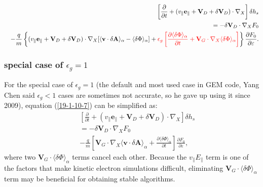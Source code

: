 \documentclass{llncs}
\newcommand{\tmcolor}[2]{{\color{#1}{#2}}}
\begin{document}
\begin{eqnarray}
  &  & \left[ \frac{\partial}{\partial t} + (v_{\parallel}
  \mathbf{e}_{\parallel} +\mathbf{V}_D + \delta \mathbf{V}_D) \cdot \nabla_X
  \right] \delta h_s \nonumber\\
  &  & = - \delta \mathbf{V}_D \cdot \nabla_X F_0 \nonumber\\
  &  & - \frac{q}{m} \left\{ (v_{\parallel} \mathbf{e}_{\parallel}
  +\mathbf{V}_D + \delta \mathbf{V}_D) \cdot \nabla_X [\langle \mathbf{v}
  \cdot \delta \mathbf{A} \rangle_{\alpha} - \langle \delta \Phi
  \rangle_{\alpha}] + \tmcolor{red}{\epsilon_g \left[ \frac{\partial \langle
  \delta \Phi \rangle_{\alpha}}{\partial t} +\mathbf{V}_G \cdot \nabla_X
  \langle \delta \Phi \rangle_{\alpha} \right]} \right\} \frac{\partial
  F_0}{\partial \varepsilon} .  \label{19-1-10-7}
\end{eqnarray}


\subsubsection{special case of $\epsilon_g = 1$}

For the special case of $\epsilon_g = 1$ (the default and most used case in
GEM code, Yang Chen said $\epsilon_g < 1$ cases are sometimes not accurate, so
he gave up using it since 2009), equation (\ref{19-1-10-7}) can be simplified
as:
\begin{eqnarray}
  &  & \left[ \frac{\partial}{\partial t} + (v_{\parallel}
  \mathbf{e}_{\parallel} +\mathbf{V}_D + \delta \mathbf{V}_D) \cdot \nabla_X
  \right] \delta h_s \nonumber\\
  &  & = - \delta \mathbf{V}_D \cdot \nabla_X F_0 \nonumber\\
  &  & - \frac{q}{m} \left[ \mathbf{V}_G \cdot \nabla_X \langle \mathbf{v}
  \cdot \delta \mathbf{A} \rangle_{\alpha} + \frac{\partial \langle \delta
  \Phi \rangle_{\alpha}}{\partial t} \right] \frac{\partial F_0}{\partial
  \varepsilon},  \label{19-1-10-7m2}
\end{eqnarray}
where two $\mathbf{V}_G \cdot \langle \delta \Phi \rangle_{\alpha}$ terms
cancel each other. Because the $v_{\parallel} E_{\parallel}$ term is one of
the factors that make kinetic electron simulations difficult, eliminating
$\mathbf{V}_G \cdot \langle \delta \Phi \rangle_{\alpha}$ term may be
beneficial for obtaining stable algorithms.
\end{document}
